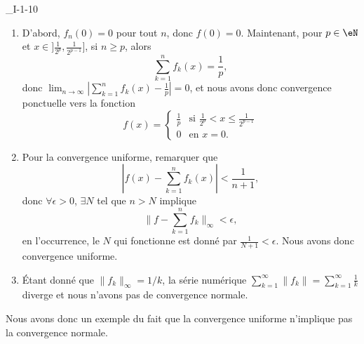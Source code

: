 

\begin{corrige}{_I-1-10}

\begin{enumerate}
\item D'abord, $f_n(0)=0$ pour tout $n$, donc $f(0)=0$. Maintenant, pour $p\in\eN$ et $x\in]\frac{1}{ 2^p },\frac{1}{ 2^{p-1} }]$, si $n\geq p$, alors
\begin{equation}
	\sum_{k=1}^{n}f_k(x)=\frac{1}{ p },
\end{equation}
donc $\lim_{n\to\infty}\left| \sum_{k=1}^n f_k(x)-\frac{1}{ p } \right|=0$, et nous avons donc convergence ponctuelle vers la fonction
\begin{equation}
	f(x)=
\begin{cases}
	\frac{1}{ p }	&	\text{si }\frac{1}{ 2^p }<x\leq \frac{1}{ 2^{p-1} }\\
	0	&	 \text{en }x=0.
\end{cases}
\end{equation}

\item Pour la convergence uniforme, remarquer que
\begin{equation}
	\left| f(x)-\sum_{k=1}^nf_k(x)\right|<\frac{1}{ n+1 },
\end{equation}
donc $\forall\epsilon > 0$, $\exists N$ tel que $n>N$ implique
\begin{equation}
	\|  f-\sum_{k=1}^nf_k \|_{\infty}<\epsilon,
\end{equation}
en l'occurrence, le $N$ qui fonctionne est donné par $\frac{1}{ N+1 }<\epsilon$. Nous avons donc convergence uniforme.

\item Étant donné que $\| f_k \|_{\infty}=1/k$, la série numérique $\sum_{k=1}^{\infty}\| f_k \|=\sum_{k=1}^{\infty}\frac{1}{ k }$ diverge et nous n'avons pas de convergence normale.
\end{enumerate}

Nous avons donc un exemple du fait que la convergence uniforme n'implique pas la convergence normale.

\end{corrige}

